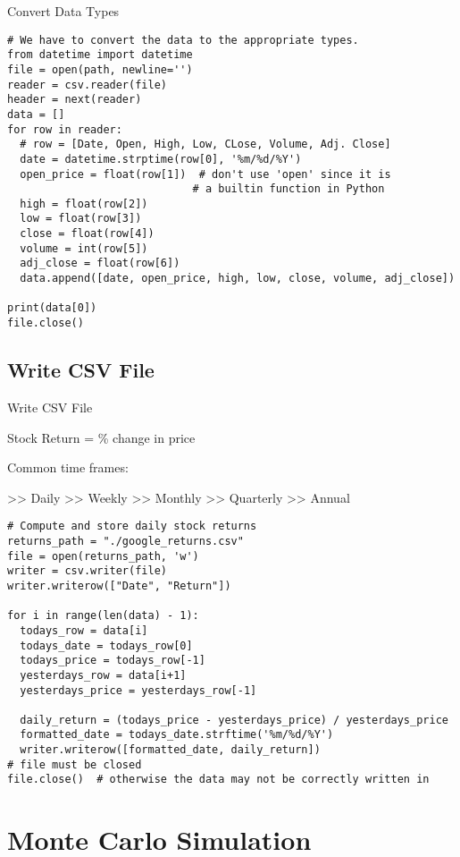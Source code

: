 \documentclass{beamer}
\begin{document}
\begin{frame}[fragile]{Convert Data Types}
\begin{verbatim}
# We have to convert the data to the appropriate types.
from datetime import datetime
file = open(path, newline='')
reader = csv.reader(file)
header = next(reader)
data = []
for row in reader:
  # row = [Date, Open, High, Low, CLose, Volume, Adj. Close]
  date = datetime.strptime(row[0], '%m/%d/%Y')
  open_price = float(row[1])  # don't use 'open' since it is
                             # a builtin function in Python
  high = float(row[2])
  low = float(row[3])
  close = float(row[4])
  volume = int(row[5])
  adj_close = float(row[6])
  data.append([date, open_price, high, low, close, volume, adj_close])

print(data[0])
file.close()
\end{verbatim}
\end{frame}

\subsection{Write CSV File}

\begin{frame}[fragile]{Write CSV File} \vspace{1em}
\footnotesize{
Stock Return = \% change in price \par
Common time frames: \par
\quad >> Daily \quad >> Weekly \quad >> Monthly 
\quad >> Quarterly \quad >> Annual}
\vspace{-.5em}
\begin{verbatim}
# Compute and store daily stock returns
returns_path = "./google_returns.csv"
file = open(returns_path, 'w')
writer = csv.writer(file)
writer.writerow(["Date", "Return"])

for i in range(len(data) - 1):
  todays_row = data[i]
  todays_date = todays_row[0]
  todays_price = todays_row[-1]
  yesterdays_row = data[i+1]
  yesterdays_price = yesterdays_row[-1]

  daily_return = (todays_price - yesterdays_price) / yesterdays_price
  formatted_date = todays_date.strftime('%m/%d/%Y')
  writer.writerow([formatted_date, daily_return])
# file must be closed
file.close()  # otherwise the data may not be correctly written in
\end{verbatim}
\end{frame}

\section{Monte Carlo Simulation}
\end{document}
